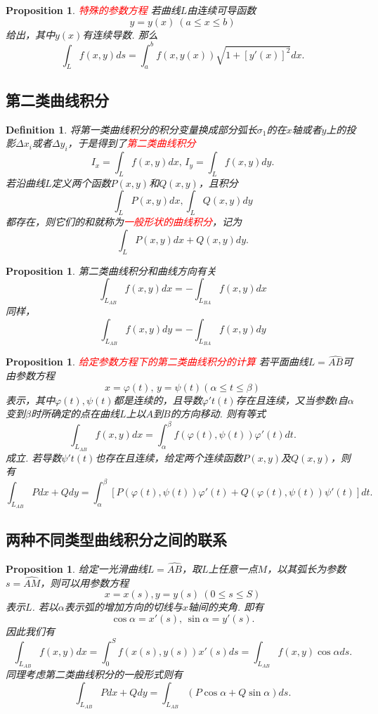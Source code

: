 \documentclass{article}
\newtheorem{proposition}[theorem]{Proposition}
\newtheorem{definition}[theorem]{Definition}
\newcommand{\redt}[1]{\textcolor{red}{#1}}
\begin{document}
\begin{proposition}
\rm \redt{特殊的参数方程} 若曲线$L$由连续可导函数
$$
y=y(x) ~ (a \leq x \leq b)
$$
给出，其中$y(x)$有连续导数. 那么
$$
\int_L f(x,y)ds = \int_a^b f(x,y(x))\sqrt{1+ [y'(x)]^2}dx. 
$$
\end{proposition}

\subsection{第二类曲线积分}

\begin{definition}
\rm 将第一类曲线积分的积分变量换成部分弧长$\sigma_1$的在$x$轴或者$y$上的投影$\Delta x_i$或者$\Delta y_i$，于是得到了\redt{第二类曲线积分}
$$
I_x = \int_L f(x,y)dx,\, I_y = \int_L f(x,y)dy.
$$
若沿曲线$L$定义两个函数$P(x,y)$和$Q(x,y)$，且积分
$$
\int_L P(x,y)dx , \int_L Q(x,y)dy 
$$
都存在，则它们的和就称为\redt{一般形状的曲线积分}，记为
$$
\int_L P(x,y)dx + Q(x,y)dy.
$$
\end{definition}

\begin{proposition}
\rm 第二类曲线积分和曲线方向有关
$$
\int_{L_{AB}} f(x,y)dx = -\int_{L_{BA}} f(x,y)dx
$$
同样，
$$
\int_{L_{AB}} f(x,y)dy = -\int_{L_{BA}} f(x,y)dy
$$
\end{proposition}

\begin{proposition}
\rm \redt{给定参数方程下的第二类曲线积分的计算} 若平面曲线$L=\widehat{AB}$可由参数方程
$$
x = \varphi(t), \, y = \psi(t) (\alpha \leq t \leq \beta)
$$
表示，其中$\varphi(t),\psi(t)$都是连续的，且导数$\varphi't(t)$存在且连续，又当参数$t$自$\alpha$变到$\beta$时所确定的点在曲线$L$上以$A$到$B$的方向移动. 则有等式
$$
\int_{L_{AB}}f(x,y)dx = \int_\alpha^\beta f(\varphi(t),\psi(t))\varphi'(t)dt. 
$$
成立. 若导数$\psi't(t)$也存在且连续，给定两个连续函数$P(x,y)$及$Q(x,y)$，则有
$$
\int_{L_{AB}} Pdx + Qdy = \int_\alpha^\beta [P(\varphi(t),\psi(t))\varphi'(t) + Q(\varphi(t),\psi(t))\psi'(t)]dt.
$$
\end{proposition}

\subsection{两种不同类型曲线积分之间的联系}

\begin{proposition}
\rm 给定一光滑曲线$L=\widehat{AB}$，取$L$上任意一点$M$，以其弧长为参数$s=\widehat{AM}$，则可以用参数方程
$$
x=x(s),y=y(s) ~ (0 \leq s \leq S)
$$
表示$L$. 若以$\alpha$表示弧的增加方向的切线与$x$轴间的夹角. 即有
$$
\cos \alpha = x'(s), \, \sin \alpha = y'(s).
$$
因此我们有
$$
\int_{L_{AB}} f(x,y)dx = \int_0^S f(x(s),y(s))x'(s)ds = \int_{L_{AB}} f(x,y)\cos \alpha ds.
$$
同理考虑第二类曲线积分的一般形式则有
$$
\int_{L_{AB}}Pdx+Qdy = \int_{L_{AB}} (P\cos\alpha +Q\sin\alpha)ds.
$$
\end{proposition}
\end{document}
